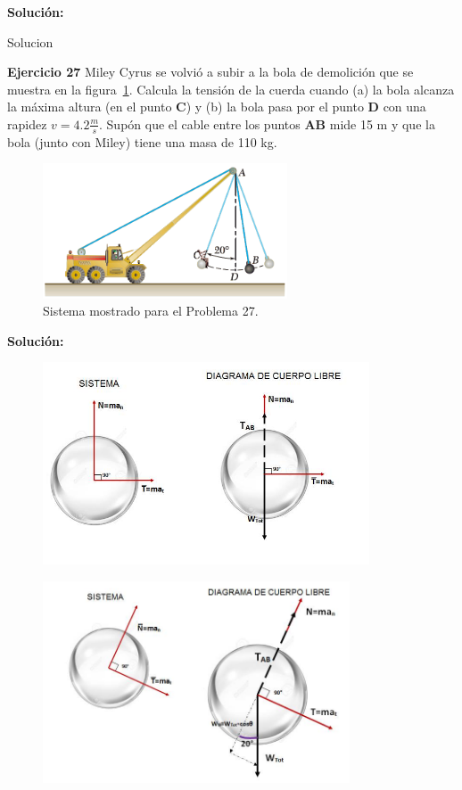 \documentclass[a4paper,11pt]{scrartcl}
\begin{document}
\textbf{Solución:}

\begin{center}

Solucion

\end{center}

\textbf{Ejercicio 27} Miley Cyrus se volvió a subir a la bola de demolición que se muestra en la figura~\ref{fig:27_1}. Calcula la tensión de la cuerda cuando (a) la bola alcanza la máxima altura (en el punto \textbf{C}) y (b) la bola pasa por el punto \textbf{D} con una rapidez $ v = 4.2 \frac{m}{s}$. Supón que el cable entre los puntos \textbf{AB} mide 15
m y que la bola (junto con Miley) tiene una masa de 110 kg. \\

\begin{figure}[H]
  \centering
  \includegraphics[height=4cm]{27_1}
  \caption{Sistema mostrado para el Problema 27.}
  \label{fig:27_1}
\end{figure}

\textbf{Solución:}

\begin{figure}[H]
  \centering
  \includegraphics[height=6cm]{27_2}
  \label{fig:27_2}
\end{figure}

\begin{figure}[H]
  \centering
  \includegraphics[height=6cm]{27_3}
  \label{fig:27_3}
\end{figure}
\end{document}
